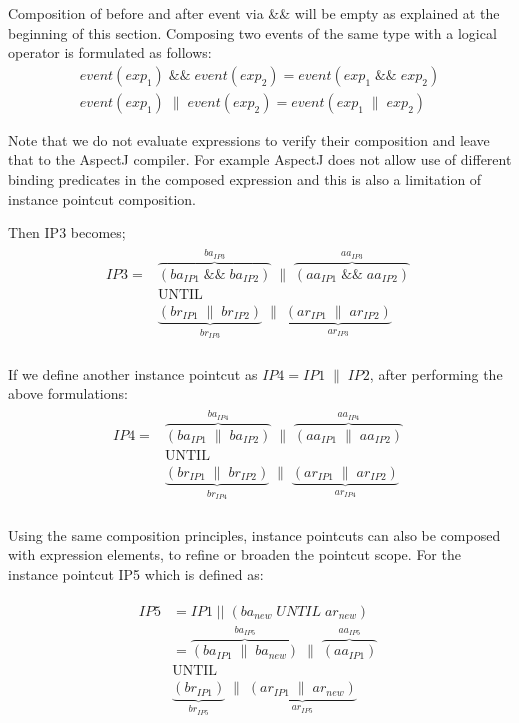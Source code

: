 \documentclass{llncs}
\begin{document}
Composition of before and after event via \&\& will be empty as explained at the beginning of this section. Composing two events of the same type with a logical operator is formulated as follows:
\begin{align*}
event(exp_1)\;\&\&\;event(exp_2) = event(exp_1\;\&\&\;exp_2) \\
event(exp_1)\;\|\;event(exp_2) = event(exp_1\;\|\;exp_2)
\end{align*}

Note that we do not evaluate expressions to verify their composition and leave that to the AspectJ compiler. For example AspectJ does not allow use of different binding predicates in the composed expression and this is also a limitation of instance pointcut composition. 

Then IP3 becomes;
\begin{align}
\begin{split}
IP3 =& \overbrace{\left( ba_{IP1}\;\textrm{\&\&}\;ba_{IP2}\right)}^{ba_{IP3}}\;\|\;\overbrace{\left( aa_{IP1}\;\textrm{\&\&}\;aa_{IP2} \right)}^{aa_{IP3}}\;\\
&\textrm{UNTIL} \\
&\underbrace{\left( br_{IP1}\;\|\;br_{IP2}\right)}_{br_{IP3}}\;\|\;\underbrace{\left( ar_{IP1}\;\|\;ar_{IP2} \right)}_{ar_{IP3}}\;\\  
\label{ip3step}
\end{split}
\end{align}

If we define another instance pointcut as $ IP4 = IP1\;\|\;IP2$, after performing the above formulations:
\begin{align}
\begin{split}
IP4 =& \overbrace{\left( ba_{IP1}\;\|\;ba_{IP2}\right)}^{ba_{IP4}}\;\|\;\overbrace{\left( aa_{IP1}\;\|\;aa_{IP2} \right)}^{aa_{IP4}}\;\\
&\textrm{UNTIL} \\
&\underbrace{\left( br_{IP1}\;\|\;br_{IP2}\right)}_{br_{IP4}}\;\|\;\underbrace{\left( ar_{IP1}\;\|\;ar_{IP2} \right)}_{ar_{IP4}}\;\\  
\label{ip3step}
\end{split}
\end{align}

Using the same composition principles, instance pointcuts can also be composed with expression elements, to refine or broaden the pointcut scope. For the instance pointcut IP5 which is defined as:

\begin{align}
\begin{split}
IP5 & = IP1\;||\;(ba_{new}\;UNTIL\;ar_{new}) \\
   & = \overbrace{\left( ba_{IP1}\;\|\;ba_{new}\right)}^{ba_{IP5}}\;\|\;\overbrace{\left( aa_{IP1} \right)}^{aa_{IP5}}\;\\
&\textrm{UNTIL} \\
&\underbrace{\left( br_{IP1}\right)}_{br_{IP5}}\;\|\;\underbrace{\left( ar_{IP1}\;\|\;ar_{new} \right)}_{ar_{IP5}}\;\\  
\end{split}
\end{align}
\end{document}
